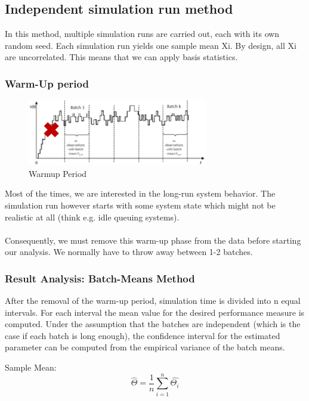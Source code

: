 \subsection{Independent simulation run method}
In this method, multiple simulation runs are carried out, each with its own
random seed. Each simulation run yields one sample mean Xi. By design,
all Xi are uncorrelated. This means that we can apply basis statistics.

\subsubsection{Warm-Up period}
\begin{figure}[H]
	\centering
	\includegraphics[width=0.7\textwidth]{figures/WarmUpPeriod.png}
	\caption{Warmup Period}
\end{figure}

Most of the times, we are interested in the long-run system behavior.
The simulation run however starts with some system state which might
not be realistic at all (think e.g. idle queuing systems).\\
\\
Consequently, we must remove this warm-up phase from the data
before starting our analysis. We normally have to throw away between 1-2
batches.

\subsubsection{Result Analysis: Batch-Means Method}
After the removal of the warm-up period, simulation time is divided into n
equal intervals. For each interval the mean value for the desired
performance measure is computed.
Under the assumption that the batches are independent (which is the
case if each batch is long enough), the confidence interval for the
estimated parameter can be computed from the empirical variance of the
batch means.

Sample Mean:
\begin{equation}
\hat{\Theta} = \frac{1}{n}\sum_{i=1}^n \hat{\Theta_i}
\end{equation}

